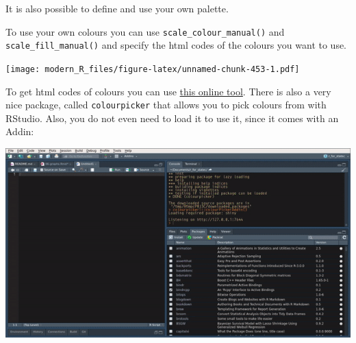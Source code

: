 \documentclass[]{gitbook}
\newenvironment{Shaded}{\begin{snugshade}}{\end{snugshade}}
\newcommand{\DataTypeTok}[1]{\textcolor[rgb]{0.13,0.29,0.53}{#1}}
\newcommand{\KeywordTok}[1]{\textcolor[rgb]{0.13,0.29,0.53}{\textbf{#1}}}
\newcommand{\NormalTok}[1]{#1}
\newcommand{\OperatorTok}[1]{\textcolor[rgb]{0.81,0.36,0.00}{\textbf{#1}}}
\newcommand{\StringTok}[1]{\textcolor[rgb]{0.31,0.60,0.02}{#1}}
\begin{document}
It is also possible to define and use your own palette.

To use your own colours you can use \texttt{scale\_colour\_manual()} and \texttt{scale\_fill\_manual()} and specify
the html codes of the colours you want to use.

\begin{Shaded}
\end{Shaded}

\texttt{[image: modern\_R\_files/figure-latex/unnamed-chunk-453-1.pdf]}

To get html codes of colours you can use \href{http://htmlcolorcodes.com/color-picker/}{this online
tool}.
There is also a very nice package, called \texttt{colourpicker} that allows you to
pick colours from with RStudio. Also, you do not even need to load it to use
it, since it comes with an Addin:

\includegraphics{pics/rstudio_colourpicker.gif}
\end{document}
